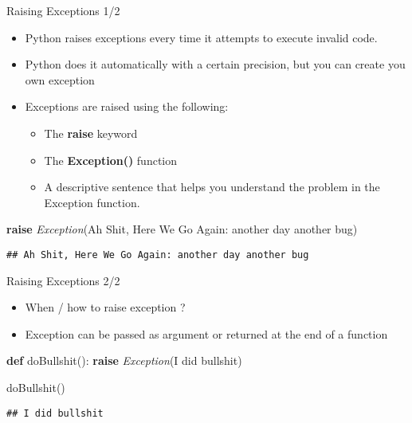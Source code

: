 \documentclass[
  8pt,
  ignorenonframetext,
]{beamer}
\newenvironment{Shaded}{\begin{snugshade}}{\end{snugshade}}
\newcommand{\ControlFlowTok}[1]{\textcolor[rgb]{0.13,0.29,0.53}{\textbf{#1}}}
\newcommand{\KeywordTok}[1]{\textcolor[rgb]{0.13,0.29,0.53}{\textbf{#1}}}
\newcommand{\NormalTok}[1]{#1}
\newcommand{\PreprocessorTok}[1]{\textcolor[rgb]{0.56,0.35,0.01}{\textit{#1}}}
\newcommand{\StringTok}[1]{\textcolor[rgb]{0.31,0.60,0.02}{#1}}
\providecommand{\tightlist}{%
  \setlength{\itemsep}{0pt}\setlength{\parskip}{0pt}}
\begin{document}
\begin{frame}[fragile]{Raising Exceptions 1/2}
\protect\hypertarget{raising-exceptions-12}{}
\begin{itemize}
\item
  Python raises exceptions every time it attempts to execute invalid
  code.
\item
  Python does it automatically with a certain precision, but you can
  create you own exception
\item
  Exceptions are raised using the following:

  \begin{itemize}
  \tightlist
  \item
    The \textbf{raise} keyword
  \item
    The \textbf{Exception()} function
  \item
    A descriptive sentence that helps you understand the problem in the
    Exception function.
  \end{itemize}
\end{itemize}

\begin{Shaded}
\begin{Highlighting}[]
\ControlFlowTok{raise} \PreprocessorTok{Exception}\NormalTok{(}\StringTok{\textquotesingle{}Ah Shit, Here We Go Again: another day another bug\textquotesingle{}}\NormalTok{)}
\end{Highlighting}
\end{Shaded}

\begin{verbatim}
## Ah Shit, Here We Go Again: another day another bug
\end{verbatim}
\end{frame}

\begin{frame}[fragile]{Raising Exceptions 2/2}
\protect\hypertarget{raising-exceptions-22}{}
\begin{itemize}
\item
  When / how to raise exception ?
\item
  Exception can be passed as argument or returned at the end of a
  function
\end{itemize}

\begin{Shaded}
\begin{Highlighting}[]
\KeywordTok{def}\NormalTok{ doBullshit():}
  \ControlFlowTok{raise} \PreprocessorTok{Exception}\NormalTok{(}\StringTok{\textquotesingle{}I did bullshit\textquotesingle{}}\NormalTok{)}

\NormalTok{doBullshit()}
\end{Highlighting}
\end{Shaded}

\begin{verbatim}
## I did bullshit
\end{verbatim}
\end{frame}
\end{document}
